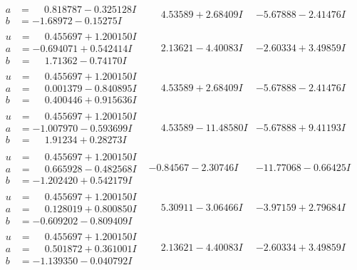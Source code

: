 \documentclass[1p]{elsarticle_modified}
\theoremstyle{definition}
\begin{document}
$$\begin{array}{c|c|c}
\begin{aligned}
a &= \phantom{-}0.818787 - 0.325128 I \\
b &= -1.68972 - 0.15275 I\end{aligned}
 & \phantom{-}4.53589 + 2.68409 I & -5.67888 - 2.41476 I \\ \hline\begin{aligned}
u &= \phantom{-}0.455697 + 1.200150 I \\
a &= -0.694071 + 0.542414 I \\
b &= \phantom{-}1.71362 - 0.74170 I\end{aligned}
 & \phantom{-}2.13621 - 4.40083 I & -2.60334 + 3.49859 I \\ \hline\begin{aligned}
u &= \phantom{-}0.455697 + 1.200150 I \\
a &= \phantom{-}0.001379 - 0.840895 I \\
b &= \phantom{-}0.400446 + 0.915636 I\end{aligned}
 & \phantom{-}4.53589 + 2.68409 I & -5.67888 - 2.41476 I \\ \hline\begin{aligned}
u &= \phantom{-}0.455697 + 1.200150 I \\
a &= -1.007970 - 0.593699 I \\
b &= \phantom{-}1.91234 + 0.28273 I\end{aligned}
 & \phantom{-}4.53589 - 11.48580 I & -5.67888 + 9.41193 I \\ \hline\begin{aligned}
u &= \phantom{-}0.455697 + 1.200150 I \\
a &= \phantom{-}0.665928 - 0.482568 I \\
b &= -1.202420 + 0.542179 I\end{aligned}
 & -0.84567 - 2.30746 I & -11.77068 - 0.66425 I \\ \hline\begin{aligned}
u &= \phantom{-}0.455697 + 1.200150 I \\
a &= \phantom{-}0.128019 + 0.800850 I \\
b &= -0.609202 - 0.809409 I\end{aligned}
 & \phantom{-}5.30911 - 3.06466 I & -3.97159 + 2.79684 I \\ \hline\begin{aligned}
u &= \phantom{-}0.455697 + 1.200150 I \\
a &= \phantom{-}0.501872 + 0.361001 I \\
b &= -1.139350 - 0.040792 I\end{aligned}
 & \phantom{-}2.13621 - 4.40083 I & -2.60334 + 3.49859 I \\ \hline\begin{aligned}

\end{aligned}
\end{array}$$
\end{document}
